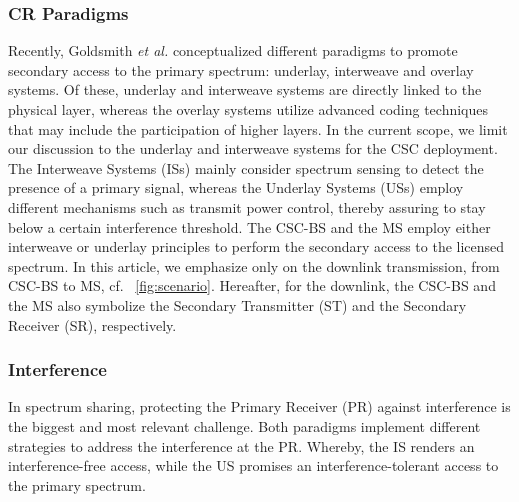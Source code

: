 \documentclass[draftcls, onecolumn, 11pt]{IEEEtran}
\begin{document}
\subsubsection*{CR Paradigms} 
Recently, Goldsmith \textit{et al.} \cite{Goldsmith09} conceptualized different paradigms to promote secondary access to the primary spectrum: underlay, interweave and overlay systems. Of these, underlay and interweave systems are directly linked to the physical layer, whereas the overlay systems utilize advanced coding techniques that may include the participation of higher layers. In the current scope, we limit our discussion to the underlay and interweave systems for the CSC deployment. The Interweave Systems (ISs) mainly consider spectrum sensing to detect the presence of a primary signal, whereas the Underlay Systems (USs) employ different mechanisms such as transmit power control, thereby assuring to stay below a certain interference threshold. 
The CSC-BS and the MS employ either interweave or underlay principles to perform the secondary access to the licensed spectrum. In this article, we emphasize only on the downlink transmission, from  CSC-BS to MS, cf. \figurename~\ref{fig:scenario}. Hereafter, for the downlink, the CSC-BS and the MS also symbolize the Secondary Transmitter (ST) and the Secondary Receiver (SR), respectively. 




\subsubsection*{Interference}
In spectrum sharing, protecting the Primary Receiver (PR) against interference is the biggest and most relevant challenge. %
Both paradigms implement different strategies to address the interference at the PR. Whereby, the IS renders an interference-free access, while the US promises an interference-tolerant access to the primary spectrum. 
\end{document}
